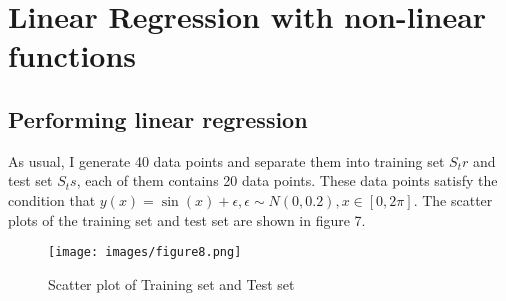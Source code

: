\documentclass[a4paper, 12pt]{article}
\begin{document}
\section{Linear Regression with non-linear functions}
\label{sec:Linear Regression}

  
  \subsection{Performing linear regression}
    As usual, I generate 40 data points and separate them into training set $S_tr$ and test set $S_ts$, each of them contains 20 data points. These data points satisfy the condition that $y(x) = \sin(x) + \epsilon, \epsilon \sim N(0, 0.2), x \in [0, 2\pi]$. The scatter plots of the training set and test set are shown in figure 7.
    \begin{figure}[h]
      \centering
      \texttt{[image: images/figure8.png]}    
      \caption{Scatter plot of Training set and Test set}
    \end{figure}
\end{document}
